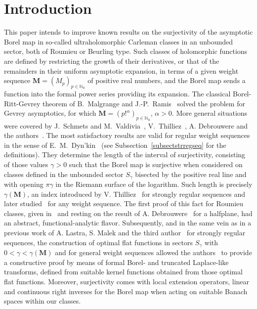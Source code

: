 \documentclass[11pt,a4paper]{article}
\theoremstyle{plain}
\theoremstyle{definition}
\numberwithin{equation}{section}
\newcommand{\N}{\mathbb{N}}
\newcommand{\M}{{\boldsymbol{M}}}
\def\ga{\gamma}
\begin{document}
\section{Introduction}
This paper intends to improve known results on the surjectivity of the asymptotic Borel map in so-called ultraholomorphic Carleman classes in an unbounded sector, both of Roumieu or Beurling type. Such classes of holomorphic functions are defined by restricting the growth of their derivatives, or that of the remainders in their uniform asymptotic expansion, in terms of a given weight sequence $\M=(M_p)_{p\in\N_0}$ of positive real numbers, and the Borel map sends a function into the formal power series providing its expansion. The classical Borel-Ritt-Gevrey theorem of B.~Malgrange and J.-P.~Ramis~\cite{Ramis1} solved the problem for Gevrey asymptotics, for which $\M=(p!^{\alpha})_{p\in\N_0}$, $\alpha>0$. More general situations were covered by J.~Schmets and M.~Valdivia~\cite{SchmetsValdivia00}, V.~Thilliez~\cite{Thilliez03}, A. Debrouwere and the authors~\cite{SanzFlatProxOrder,JimenezSanzSchindlInjectSurject, momentsdebrouwere,DebrouwereBorelRittBeurlingClasses, JimenezSanzSchindlSurjectDC,JimenezMiguelSanzSchindlOptFlat}.
The most satisfactory results are valid for regular weight sequences in the sense of E.~M.~Dyn'kin~\cite{Dynkin80} (see Subsection~\ref{subsectstrregseq} for the definitions). They determine the length of the interval of surjectivity, consisting of those values $\ga>0$ such that the Borel map is surjective when considered on classes defined in the unbounded sector $S_{\gamma}$ bisected by the positive real line and with opening $\pi\gamma$ in the Riemann surface of the logarithm. Such length is precisely $\gamma(\M)$, an index introduced by V. Thilliez~\cite{Thilliez03} for strongly regular sequences and later studied~\cite{JimenezSanzSchindlIndex} for any weight sequence. The first proof of this fact for Roumieu classes, given in~\cite{JimenezSanzSchindlSurjectDC} and resting on the result of A. Debrouwere~\cite{momentsdebrouwere} for a halfplane, had an abstract, functional-analytic flavor. Subsequently, and in the same vein as in a previous work of A. Lastra, S. Malek and the third author~\cite{LastraMalekSanzContinuousRightLaplace} for strongly regular sequences, the construction of optimal flat functions in sectors $S_{\ga}$ with $0<\ga<\ga(\M)$ and for general weight sequences allowed the authors~\cite{JimenezMiguelSanzSchindlOptFlat} to provide a constructive proof by means of formal Borel- and truncated Laplace-like transforms, defined from suitable kernel functions obtained from those optimal flat functions. Moreover, surjectivity comes with local extension operators, linear and continuous right inverses for the Borel map when acting on suitable Banach spaces within our classes.
\end{document}
